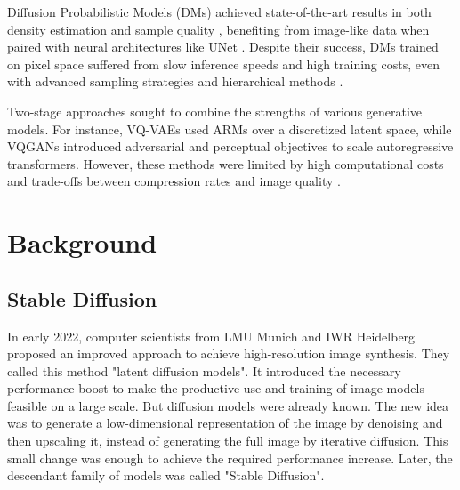 \documentclass[11pt]{article}
\begin{document}
Diffusion Probabilistic Models (DMs) \cite{sohldickstein2015deepunsupervisedlearningusing} achieved state-of-the-art results in both density estimation \cite{kingma2023variationaldiffusionmodels} and sample quality \cite{dhariwal2021diffusionmodelsbeatgans}, benefiting from image-like data when paired with neural architectures like UNet \cite{dhariwal2021diffusionmodelsbeatgans, ronneberger2015unetconvolutionalnetworksbiomedical, DBLP:journals/corr/abs-2011-13456}. Despite their success, DMs trained on pixel space suffered from slow inference speeds and high training costs, even with advanced sampling strategies and hierarchical methods \cite{DBLP:journals/corr/abs-2106-15282, DBLP:journals/corr/abs-2106-00132, DBLP:journals/corr/abs-2104-02600, DBLP:conf/iclr/SongME21, DBLP:journals/corr/abs-2106-05931}.

Two-stage approaches \cite{DBLP:conf/iclr/DaiW19, esser2021tamingtransformershighresolutionimage, DBLP:conf/nips/RazaviOV19, DBLP:conf/nips/RombachEO20, DBLP:journals/corr/abs-2104-10157, yu2021vectorquantized} sought to combine the strengths of various generative models. For instance, VQ-VAEs \cite{DBLP:conf/nips/RazaviOV19, DBLP:journals/corr/abs-2104-10157} used ARMs over a discretized latent space, while VQGANs \cite{esser2021tamingtransformershighresolutionimage, yu2021vectorquantized} introduced adversarial and perceptual objectives to scale autoregressive transformers. However, these methods were limited by high computational costs and trade-offs between compression rates and image quality \cite{esser2021tamingtransformershighresolutionimage, ramesh2021zeroshottexttoimagegeneration}.





\section{Background}
\subsection{Stable Diffusion}
\label{heading:subsection:stable_diffusion}
In early 2022, computer scientists from LMU Munich and IWR Heidelberg proposed an improved approach to achieve high-resolution image synthesis\cite{rombach2022stablediffusion}. They called this method "latent diffusion models". It introduced the necessary performance boost to make the productive use and training of image models feasible on a large scale. But diffusion models were already known. The new idea was to generate a low-dimensional representation of the image by denoising and then upscaling it, instead of generating the full image by iterative diffusion. This small change was enough to achieve the required performance increase. Later, the descendant family of models was called "Stable Diffusion".
\end{document}
